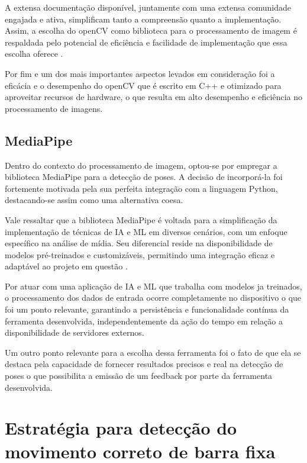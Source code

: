 A extensa documentação disponível, juntamente com uma extensa comunidade engajada e ativa, simplificam tanto a compreensão quanto a implementação. Assim, a escolha do \ac{openCV} como biblioteca para o processamento de imagem é respaldada pelo potencial de eficiência e facilidade de implementação que essa escolha oferece \cite{opencv_docs}.


Por fim e um dos mais importantes aspectos levados em consideração foi a eficácia e o desempenho do \ac{openCV} que é escrito em C++ e otimizado para aproveitar recursos de hardware, o que resulta em alto desempenho e eficiência no processamento de imagens.


\subsection{MediaPipe}

Dentro do contexto do processamento de imagem, optou-se por empregar a biblioteca MediaPipe para a detecção de poses. A decisão de incorporá-la foi fortemente motivada pela sua perfeita integração com a linguagem Python, destacando-se assim como uma alternativa coesa.

Vale ressaltar que a biblioteca MediaPipe é voltada para a simplificação da implementação de técnicas de \ac{IA} e \ac{ML} em diversos cenários, com um enfoque específico na análise de mídia. Seu diferencial reside na disponibilidade de modelos pré-treinados e customizáveis, permitindo uma integração eficaz e adaptável ao projeto em questão \cite{mediapipe_guide}.

Por atuar com uma aplicação de \ac{IA} e \ac{ML} que trabalha com modelos ja treinados, o processamento dos dados de entrada ocorre completamente no dispositivo o que foi um ponto relevante, garantindo a persistência e funcionalidade contínua da ferramenta desenvolvida, independentemente da ação do tempo em relação a disponibilidade de servidores externos.

Um outro ponto relevante para a escolha dessa ferramenta foi o fato de que ela se destaca pela capacidade de fornecer resultados precisos e real na detecção de poses o que possibilita a emissão de um feedback por parte da ferramenta desenvolvida.





\section[Estratégia para detecção do movimento correto de barra fixa]{Estratégia para detecção do movimento correto de barra fixa}\label{sec:Estrategia para deteccao do movimento correto de barra fixa}


